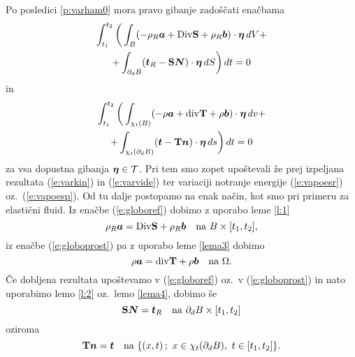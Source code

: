 Po posledici \ref{p:varham0} mora pravo gibanje zadoščati enačbama
\begin{multline} \label{e:globoref}
	\int_{t_1}^{t_2}\bigg( \int_{B}(-\rho_R\boldsymbol a+
	\mathrm {Div}\mathbf S+\rho_R\boldsymbol b)\cdot\boldsymbol \eta\,dV+ \\
	+\int_{\partial_d B}(\boldsymbol t_R-\mathbf S\boldsymbol N)\cdot\boldsymbol \eta\,dS\bigg)\,dt=0
\end{multline}
in
\begin{multline} \label{e:globoprost}
	\int_{t_1}^{t_2}\bigg( \int_{\chi_t(B)}(-\rho\boldsymbol a+
	\mathrm{div}\mathbf T+\rho\boldsymbol b)\cdot\boldsymbol \eta\,dv+ \\
	+\int_{\chi_t(\partial_d B)}(\boldsymbol t-\mathbf T\boldsymbol n)\cdot\boldsymbol \eta\,ds\bigg)\,dt=0
\end{multline}
za vsa dopustna gibanja $\boldsymbol \eta\in\mathcal{T}$. Pri tem smo zopet upoštevali
že prej izpeljana rezultata (\ref{e:varkin}) in (\ref{e:varvide}) ter
variaciji notranje energije (\ref{e:vapoesr}) oz.~(\ref{e:vapoesp}).
Od tu dalje postopamo na enak način, kot smo pri primeru za elastični fluid.
Iz enačbe (\ref{e:globoref}) dobimo z uporabo leme \ref{l:1}
\begin{equation*}
	\rho_R\vek{a}=\Div\ten{S}+\rho_R\vek{b}\quad\textrm{na}\ B\times[t_1,t_2],
\end{equation*}
iz enačbe (\ref{e:globoprost}) pa z uporabo leme \ref{lema3} dobimo
\begin{equation*}
	\rho\vek{a}=\div\ten{T}+\rho\vek{b}\quad\textrm{na}\ \Omega.
\end{equation*}
Če dobljena rezultata upoštevamo v (\ref{e:globoref}) oz.~v (\ref{e:globoprost}) in
nato uporabimo lemo \ref{l:2} oz.~lemo \ref{lema4}, dobimo še
\begin{equation*}
	\ten{S}\vek{N}=\vek{t}_R\quad\textrm{na}\ \partial_dB\times[t_1,t_2]
\end{equation*}
oziroma
\begin{equation*}
	\ten{T}\vek{n}=\vek{t}\quad\textrm{na}\ \{(x,t)\,;\ x\in\chi_t(\partial_dB),\ t\in[t_1,t_2] \}.
\end{equation*}